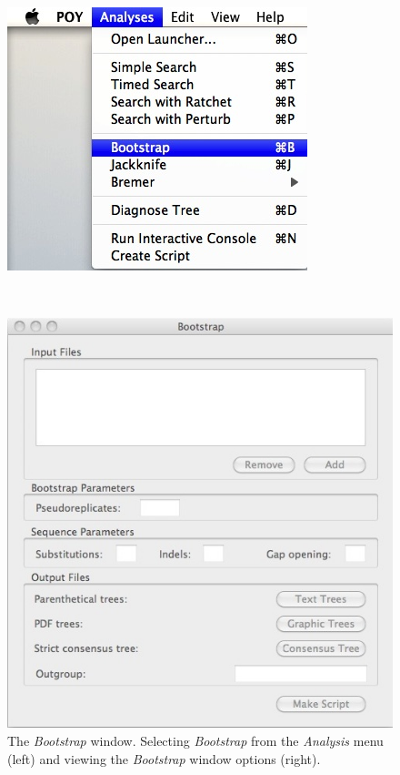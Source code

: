 {\begin{figure}
\centering
\begin{minipage}[c]{0.45\textwidth}
\includegraphics[width=\textwidth]{doc/figures/bootstrap_menu.jpg}
\end{minipage}
\,
\begin{minipage}[c]{0.52\textwidth}
\includegraphics[width=\textwidth]{doc/figures/bootstrap_window.jpg}
\end{minipage}
\caption{The \emph{Bootstrap} window. Selecting \emph{Bootstrap} 
from the \emph{Analysis} menu (left) and viewing the \emph{Bootstrap} 
window options (right).}
\label{fig:bootstrap}
\end{figure}

}
